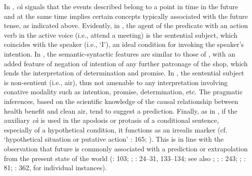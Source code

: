 \documentclass[output=paper,colorlinks,citecolor=brown]{langscibook}
\begin{document}
In , \textit{cà} signals that the events described belong to a point in time in the future and at the same time implies certain concepts typically associated with the future tense, as indicated above. Evidently, in , the agent of the predicate with an action verb in the active voice (i.e., attend a meeting) is the sentential subject, which coincides with the speaker (i.e., ‘I’), an ideal condition for invoking the speaker’s intention. In , the semantic-syntactic features are similar to those of , with an added feature of negation of intention of any further patronage of the shop, which lends the interpretation of determination and promise. In , the sentential subject is non-sentient (i.e., air), thus not amenable to any interpretation involving conative modality such as intention, promise, determination, etc. The pragmatic inferences, based on the scientific knowledge of the causal relationship between health benefit and clean air, tend to suggest a prediction. Finally, as in , if the auxiliary \textit{cà} is used in the apodosis or protasis of a conditional sentence, especially of a hypothetical condition, it functions as an irrealis marker (cf. ‘hypothetical situation or putative action’ \cite{Noss1964}: 165; \cite{Soithurum2010}). This is in line with the observation that future is commonly associated with a prediction or extrapolation from the present state of the world (\cite{Dahl1985}: 103; \cite{comrie_identifying_1989}; \cite{Fleischman1982}: 24--31, 133--134; see also \cite{Kratzer1991}; \cite{Sarkar1998}; \cite{Sanso2006}: 243; \cite{Soithurum2010}; \cite{aikhenwald2010}: 81; \cite{StenzelGomezImbert2018}: 362, for individual instances). 
\end{document}

